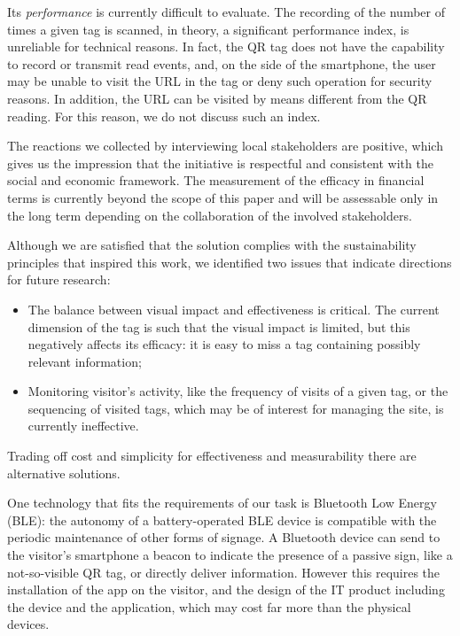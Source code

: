 \documentclass[sustainability,article,submit,pdftex,moreauthors]{Definitions/mdpi}
\begin{document}
Its {\em performance} is currently difficult to evaluate. The recording of the number of times a given tag is scanned, in theory, a significant performance index, is unreliable for technical reasons. In fact, the QR tag does not have the capability to record or transmit read events, and, on the side of the smartphone, the user may be unable to visit the URL in the tag or deny such operation for security reasons. In addition, the URL can be visited by means different from the QR reading. For this reason, we do not discuss such an index.

The reactions we collected by interviewing local stakeholders are positive, which gives us the impression that the initiative is respectful and consistent with the social and economic framework. The measurement of the efficacy in financial terms is currently beyond the scope of this paper and will be assessable only in the long term depending on the collaboration of the involved stakeholders.

Although we are satisfied that the solution complies with the sustainability principles that inspired this work, we identified two issues that indicate directions for future research:

\begin{itemize}
    \item The balance between visual impact and effectiveness is critical. The current dimension of the tag is such that the visual impact is limited, but this negatively affects its efficacy: it is easy to miss a tag containing possibly relevant information;
    \item Monitoring visitor's activity, like the frequency of visits of a given tag, or the sequencing of visited tags, which may be of interest for managing the site, is currently ineffective.
\end{itemize}

Trading off cost and simplicity for effectiveness and measurability there are alternative solutions.

One technology that fits the requirements of our task is Bluetooth Low Energy (BLE): the autonomy of a battery-operated BLE device is compatible with the periodic maintenance of other forms of signage. A Bluetooth device can send to the visitor's smartphone a beacon to indicate the presence of a passive sign, like a not-so-visible QR tag, or directly deliver information. However this requires the installation of the app on the visitor, and the design of the IT product including the device and the application, which may cost far more than the physical devices. 
\end{document}
